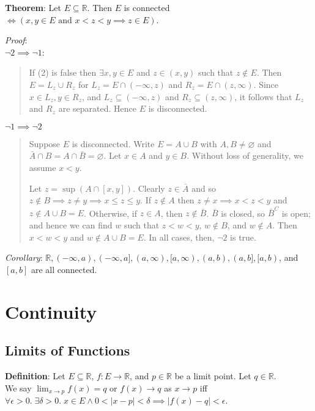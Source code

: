 \documentclass[11pt]{article}
\begin{document}
\textbf{Theorem}: Let $E \subseteq \mathbb{R}$. Then $E$ is connected $\iff (x,y \in E \text{ and }x < z < y \implies z \in E)$.

\emph{Proof}:\\
$\neg 2 \implies \neg 1$:
\begin{quote}\vspace{-0.3cm}
If (2) is false then $\exists x,y \in E$ and $z \in (x,y)$ such that $z \notin E$. Then $E = L_z \cup R_z$ for $L_z = E \cap (-\infty, z)$ and $R_z = E \cap (z, \infty)$. Since $x \in L_z, y \in R_z$, and $L_z \subseteq (-\infty, z)$ and $R_z \subseteq (z, \infty)$, it follows that $L_z$ and $R_z$ are separated. Hence $E$ is disconnected.
\end{quote}
$\neg 1 \implies \neg 2$
\begin{quote}\vspace{-0.3cm}
Suppose $E$ is disconnected. Write $E = A \cup B$ with $A, B \neq \varnothing$ and $\bar{A} \cap B = A \cap \bar{B} = \varnothing$. Let $x \in A$ and $y \in B$. Without loss of generality, we assume $x < y$.

Let $z = \sup(A \cap [x,y])$. Clearly $z \in \bar{A}$ and so $z \notin B \implies z \neq y \implies x \leq z \leq y$. If $z \notin A$ then $z \neq x \implies x < z < y$ and $z \notin A \cup B = E$. Otherwise, if $z \in A$, then $z \notin \bar{B}$. $\bar{B}$ is closed, so $\bar{B}^C$ is open; and hence we can find $w$ such that $z < w < y$, $w \notin B$, and $w \notin A$. Then $x < w < y$ and $w \notin A \cup B = E$. In all cases, then, $\neg 2$ is true.
\end{quote}

\emph{Corollary}: $\mathbb{R}, (-\infty, a), (-\infty, a], (a, \infty), [a, \infty), (a,b), (a,b], [a,b)$, and $[a,b]$ are all connected.

\section{Continuity}

\subsection{Limits of Functions}

\textbf{Definition}: Let $E \subseteq \mathbb{R}$, $f : E \to \mathbb{R}$, and $p \in \mathbb{R}$ be a limit point. Let $q \in \mathbb{R}$.\\
We say $\lim_{x \to p} f(x) = q$ or $f(x) \to q$ as $x \to p$ iff $\forall \epsilon > 0.\; \exists \delta > 0.\; x \in E \land 0 < |x-p| < \delta \implies |f(x) - q| < \epsilon$.
\end{document}
